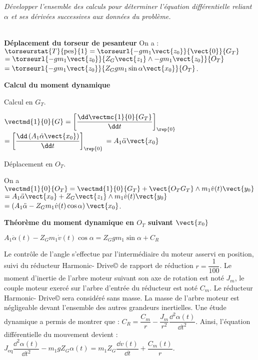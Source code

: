\begin{multicols}{2}
\subparagraph{} \textit{Développer l'ensemble des calculs pour déterminer l'équation différentielle reliant $\alpha$ et ses dérivées
successives aux données du problème.}
\ifprof
\begin{corrige} ~\\

\textbf{Déplacement du torseur de pesanteur}
On a : $\torseurstat{T}{\text{pes}}{1} = \torseurl{-gm_1\vect{z_0}}{\vect{0}}{G_T}$ 
$= \torseurl{-gm_1\vect{z_0}}{Z_G \vect{z_1}\wedge -gm_1\vect{z_0}}{O_T}$
$= \torseurl{-gm_1\vect{z_0}}{Z_G gm_1\sin\alpha \vect{x_0}}{O_T}$.


\textbf{Calcul du moment dynamique} 

Calcul en $G_T$. 

$\vectmd{1}{0}{G} = \left[\dfrac{\dd \vectmc{1}{0}{G_T}}{\dd t}\right]_{\rep{0}}$ $=\left[\dfrac{\dd \left( A_1 \dot{\alpha}\vect{x_0}\right)}{\dd t}\right]_{\rep{0}}$
$= A_1 \ddot{\alpha}\vect{x_0}$

Déplacement en $O_T$. 

On a $\vectmd{1}{0}{O_T} = \vectmd{1}{0}{G_T} + \vect{O_T G_T}\wedge m_1 \dot{v}(t) \vect{y_0}$
$= A_1 \ddot{\alpha}\vect{x_0} + Z_G \vect{z_1} \wedge m_1 \dot{v}(t) \vect{y_0}$
$= \left(A_1 \ddot{\alpha} - Z_G   m_1 \dot{v}(t) \cos \alpha \right)\vect{x_0} $.


\textbf{Théorème du moment dynamique en $O_T$ suivant $\vect{x_0}$}

$A_1 \ddot{\alpha}(t) - Z_G   m_1 \dot{v}(t) \cos \alpha = Z_G gm_1\sin\alpha  +C_R $


\end{corrige}
\else
\fi

\ifprof
\else
Le contrôle de l'angle s'effectue par l'intermédiaire du moteur asservi en position, suivi du réducteur Harmonic-
Drive© de rapport de réduction $r= \dfrac{1}{100}$. Le moment d'inertie de l'arbre moteur suivant son axe de rotation est
noté $J_m$, le couple moteur exercé sur l'arbre d'entrée du réducteur est noté $C_m$. Le réducteur Harmonic-
Drive© sera considéré sans masse. La masse de l'arbre moteur est négligeable devant l'ensemble des autres
grandeurs inertielles. Une étude dynamique a permis de montrer que : $C_R=\dfrac{C_m}{r}-\dfrac{J_m}{r^2}\dfrac{\dd^2\alpha(t)}{\dd t^2}$. Ainsi, l'équation
différentielle du mouvement devient : 
$J_{\text{eq}} \dfrac{\dd^2\alpha(t)}{\dd t^2} -m_1gZ_G\alpha(t)=m_1 Z_G \dfrac{\dd v(t)}{\dd t}+\dfrac{C_m(t)}{r}$.


\end{multicols}
